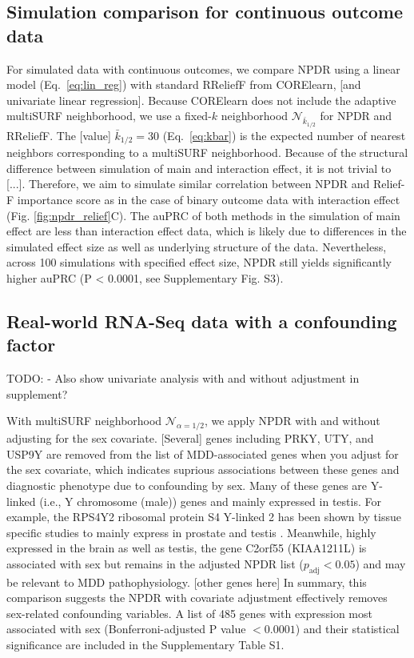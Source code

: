 \documentclass[10pt]{article}
\begin{document}
\subsection{Simulation comparison for continuous outcome data} 
For simulated data with continuous outcomes, we compare NPDR using a linear model (Eq.~\ref{eq:lin_reg}) with standard RReliefF from CORElearn, [and univariate linear regression].
Because CORElearn does not include the adaptive multiSURF neighborhood, we use a fixed-$k$ neighborhood $\mathcal{N}_{\bar{k}_{1/2}}$ for NPDR and RReliefF.
The [value] $\bar{k}_{1/2}=30$ (Eq.~\ref{eq:kbar}) is the expected number of nearest neighbors corresponding to a multiSURF neighborhood.
Because of the structural difference between simulation of main and interaction effect, it is not trivial to [...].
Therefore, we aim to simulate similar correlation between NPDR and Relief-F importance score as in the case of binary outcome data with interaction effect (Fig. \ref{fig:npdr_relief}C).
The auPRC of both methods in the simulation of main effect are less than interaction effect data, which is likely due to differences in the simulated effect size as well as underlying structure of the data.
Nevertheless, across 100 simulations with specified effect size, NPDR still yields significantly higher auPRC (P < 0.0001, see Supplementary Fig. S3).

\subsection{Real-world RNA-Seq data with a confounding factor}

TODO:
- Also show univariate analysis with and without adjustment in supplement? 


With multiSURF neighborhood $\mathcal{N}_{\alpha=1/2}$, we apply NPDR with and without adjusting for the sex covariate.
[Several] genes including PRKY, UTY, and USP9Y are removed from the list of MDD-associated genes when you adjust for the sex covariate, which indicates suprious associations between these genes and diagnostic phenotype due to confounding by sex.
Many of these genes are Y-linked (i.e., Y chromosome (male)) genes and mainly expressed in testis.
For example, the RPS4Y2 ribosomal protein S4 Y-linked 2 has been shown by tissue specific studies to mainly express in prostate and testis \cite{lopes2010human}.
Meanwhile, highly expressed in the brain as well as testis, the gene C2orf55 (KIAA1211L) is associated with sex but remains in the adjusted NPDR list ($p_\textrm{adj} < 0.05$) and may be relevant to MDD pathophysiology.
[other genes here]
In summary, this comparison suggests the NPDR with covariate adjustment effectively removes sex-related confounding variables.
A list of 485 genes with expression most associated with sex (Bonferroni-adjusted P value $<0.0001$) and their statistical significance are included in the Supplementary Table S1.
\end{document}
